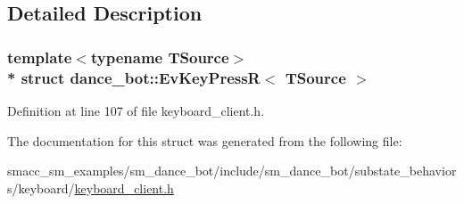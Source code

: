 \subsection{Detailed Description}
\subsubsection*{template$<$typename T\+Source$>$\\*
struct dance\+\_\+bot\+::\+Ev\+Key\+Press\+R$<$ T\+Source $>$}



Definition at line 107 of file keyboard\+\_\+client.\+h.



The documentation for this struct was generated from the following file\+:\begin{DoxyCompactItemize}
\item 
smacc\+\_\+sm\+\_\+examples/sm\+\_\+dance\+\_\+bot/include/sm\+\_\+dance\+\_\+bot/substate\+\_\+behaviors/keyboard/\hyperlink{keyboard__client_8h}{keyboard\+\_\+client.\+h}\end{DoxyCompactItemize}
